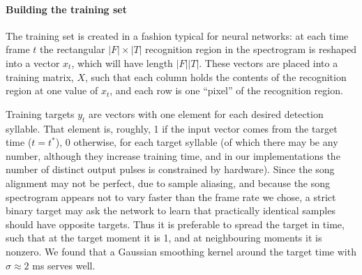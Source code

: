 \documentclass[10pt,letterpaper]{article}
\let\oldmarginpar\marginpar
\renewcommand{\marginpar}[1]{\oldmarginpar{\linespread{1}\scriptsize{#1}}}
\renewcommand{\subsubsection}[1]{\paragraph{#1}}
\begin{document}



\subsubsection{Building the training set}

The training set is created in a fashion typical for neural networks:
at each time frame $t$ the rectangular $|F|\times |T|$ recognition
region in the spectrogram is reshaped into a vector $x_t$, which will
have length $|F||T|$.  These vectors are placed into a training
matrix, $X$, such that each column holds the contents of the
recognition region at one value of $x_t$, and each row is one
``pixel'' of the recognition region.

Training targets $y_t$ are vectors with one element for each desired detection syllable.  That element is, roughly, 1 if the input vector comes from the
target time ($t=t^*$), 0 otherwise, for each target syllable (of which there may be any number, although they increase training time, and in our implementations the number of distinct output pulses is constrained by hardware).  Since the song
alignment may not be perfect, due to sample aliasing, and because the song spectrogram appears not to vary faster than the frame rate we chose, a strict binary target may ask the network to learn that practically identical samples should have opposite targets. Thus it is preferable to spread the target
in time, such that at the target moment it is 1,
and at neighbouring moments it is nonzero. We found that a Gaussian
smoothing kernel around the target time with $\sigma\approx 2$ ms serves well.
\end{document}
